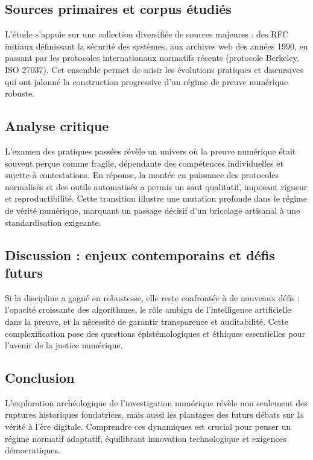 \documentclass[12pt, a4paper]{article}
\begin{document}
\begin{enumerate}[label=\textbf{\arabic*.}, start=6]
		\subsection*{Sources primaires et corpus étudiés}
		
		L'étude s'appuie sur une collection diversifiée de sources majeures : des RFC initiaux définissant la sécurité des systèmes, aux archives web des années 1990, en passant par les protocoles internationaux normatifs récents (protocole Berkeley, ISO 27037). Cet ensemble permet de saisir les évolutions pratiques et discursives qui ont jalonné la construction progressive d'un régime de preuve numérique robuste.
		
		\subsection*{Analyse critique}
		
		L'examen des pratiques passées révèle un univers où la preuve numérique était souvent perçue comme fragile, dépendante des compétences individuelles et sujette à contestations. En réponse, la montée en puissance des protocoles normalisés et des outils automatisés a permis un saut qualitatif, imposant rigueur et reproductibilité. Cette transition illustre une mutation profonde dans le régime de vérité numérique, marquant un passage décisif d'un bricolage artisanal à une standardisation exigeante.
		
		\subsection*{Discussion : enjeux contemporains et défis futurs}
		
		Si la discipline a gagné en robustesse, elle reste confrontée à de nouveaux défis : l'opacité croissante des algorithmes, le rôle ambigu de l'intelligence artificielle dans la preuve, et la nécessité de garantir transparence et auditabilité. Cette complexification pose des questions épistémologiques et éthiques essentielles pour l'avenir de la justice numérique.
		
		\subsection*{Conclusion}
		
		L'exploration archéologique de l'investigation numérique révèle non seulement des ruptures historiques fondatrices, mais aussi les plantages des futurs débats sur la vérité à l'ère digitale. Comprendre ces dynamiques est crucial pour penser un régime normatif adaptatif, équilibrant innovation technologique et exigences démocratiques.
		

\end{enumerate}
\end{document}
